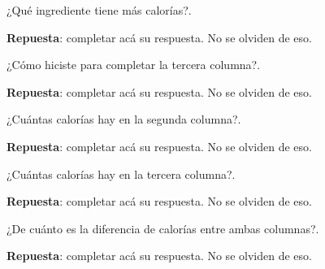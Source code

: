\documentclass[10pt]{examdesign}
\theoremstyle{plain}
\theoremstyle{definition}
\theoremstyle{remark}
\begin{document}
\begin{shortanswer}[title={\textit{Receta que le dijo la Abuela Pocha a Ana y
    			Juan.}},
    	rearrange=no,resetcounter=no]
\begin{question}
\begin{answer}
    		\end{answer}
    	\end{question}
        \begin{question}
        	¿Qué ingrediente tiene más calorías?.
        	\begin{answer}
        		\textbf{Repuesta}: completar acá su respuesta. No se olviden de eso.
        	\end{answer}
        \end{question}
        \begin{question}
        	¿Cómo hiciste para completar la tercera columna?.
        	\begin{answer}
        		\textbf{Repuesta}: completar acá su respuesta. No se olviden de eso.
        	\end{answer}
        \end{question}
        \begin{question}
        	¿Cuántas calorías hay en la segunda columna?.
        	\begin{answer}
        		\textbf{Repuesta}: completar acá su respuesta. No se olviden de eso.
        	\end{answer}
        \end{question}
        \begin{question}
        	¿Cuántas calorías hay en la tercera columna?.
        	\begin{answer}
        		\textbf{Repuesta}: completar acá su respuesta. No se olviden de eso.
        	\end{answer}
        \end{question}
        \begin{question}
        	¿De cuánto es la diferencia de calorías entre ambas columnas?.
        	\begin{answer}
        		\textbf{Repuesta}: completar acá su respuesta. No se olviden de eso.
        	\end{answer}
        \end{question}

\end{shortanswer}
\end{document}
